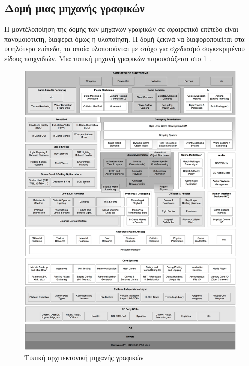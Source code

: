 \subsection{Δομή μιας μηχανής γραφικών}
Η μοντέλοποίηση της δομής των μηχανων γραφικών σε αφαιρετικό επίπεδο είναι πανομοιότυπη, διαφέρει όμως η υλοποίηση. Η δομή ξεκινά να διαφοροποιείται στα υψηλότερα επίπεδα, τα οποία υλοποιούνται με στόχο για σχεδιασμό συγκεκριμένου είδους παιχνιδιών. Μια τυπική μηχανή γραφικών παρουσιάζεται στο \ref{fig:Game_Engine_Architecture} \cite{gregory2009game}.
	\begin{figure}
		\centering
		\includegraphics[width=160mm]{Images/game_engine_architecture}
		\caption{Τυπική αρχιτεκτονική μηχανής γραφικών}
		\label{fig:Game_Engine_Architecture}
	\end{figure}	

